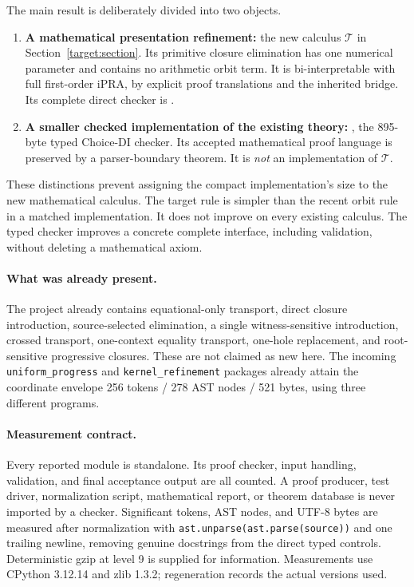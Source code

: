 \documentclass[11pt,a4paper]{article}
\theoremstyle{definition}\newtheorem{definition}[theorem]{Definition}
\begin{document}
The main result is deliberately divided into two objects.
\begin{enumerate}
\item \textbf{A mathematical presentation refinement:} the new calculus
$\mathcal T$ in Section~\ref{target:section}. Its primitive closure
elimination has one numerical parameter and contains no arithmetic orbit
term. It is bi-interpretable with full first-order iPRA, by explicit proof
translations and the inherited bridge. Its complete direct checker is
.
\item \textbf{A smaller checked implementation of the existing theory:}
, the 895-byte typed Choice-DI checker. Its accepted
mathematical proof language is preserved by a parser-boundary theorem.
It is \emph{not} an implementation of $\mathcal T$.
\end{enumerate}

These distinctions prevent assigning the compact implementation's size to
the new mathematical calculus. The target rule is simpler than the recent
orbit rule in a matched implementation. It does not improve on every
existing calculus. The typed checker improves a concrete complete
interface, including validation, without deleting a mathematical axiom.

\paragraph{What was already present.}
The project already contains equational-only transport, direct closure
introduction, source-selected elimination, a single witness-sensitive
introduction, crossed transport, one-context equality transport,
one-hole replacement, and root-sensitive progressive closures. These are
not claimed as new here. The incoming \texttt{uniform\_progress} and
\texttt{kernel\_refinement} packages already attain the coordinate
envelope 256 tokens / 278 AST nodes / 521 bytes, using three different
programs.\cite{readme,uniform,kernel,onecontext}

\paragraph{Measurement contract.}
Every reported module is standalone. Its proof checker, input handling,
validation, and final acceptance output are all counted. A proof producer,
test driver, normalization script, mathematical report, or theorem database
is never imported by a checker. Significant tokens, AST nodes, and UTF-8
bytes are measured after normalization with
\texttt{ast.unparse(ast.parse(source))} and one trailing newline, removing
genuine docstrings from the direct typed controls. Deterministic gzip at
level 9 is supplied for information. Measurements use CPython 3.12.14 and
zlib 1.3.2; regeneration records the actual versions used.
\end{document}
